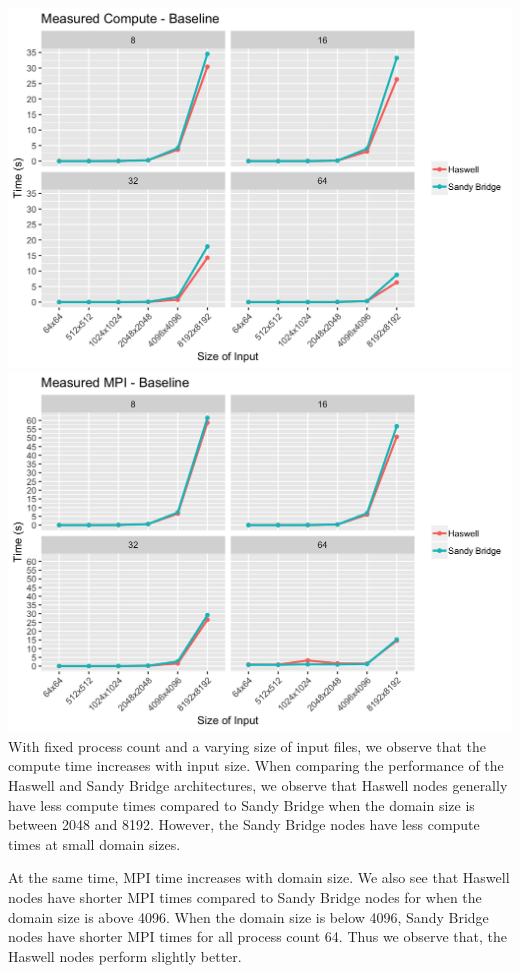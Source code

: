 \documentclass[10pt, letterpaper, twoside]{article}
\begin{document}
\begin{titlepage}
\begin{enumerate}
\includegraphics[scale = 0.18]{Baseline_Measured-Compute_Processes.png}
\includegraphics[scale = 0.18]{Baseline_Measured-MPI_Processes.png}
\\
With fixed process count and a varying size of input files, we observe that the compute time increases with input size. When comparing the performance of the Haswell and Sandy Bridge architectures, we observe that Haswell nodes generally have less compute times compared to Sandy Bridge when the domain size is between 2048 and 8192. However, the Sandy Bridge nodes have less compute times at small domain sizes.

At the same time, MPI time increases with domain size. We also see that Haswell nodes have shorter MPI times compared to Sandy Bridge nodes for when the domain size is above 4096. When the domain size is below 4096, Sandy Bridge nodes have shorter MPI times for all process count 64. Thus we observe that, the Haswell nodes perform slightly better. 


\end{enumerate}
\end{titlepage}
\end{document}
